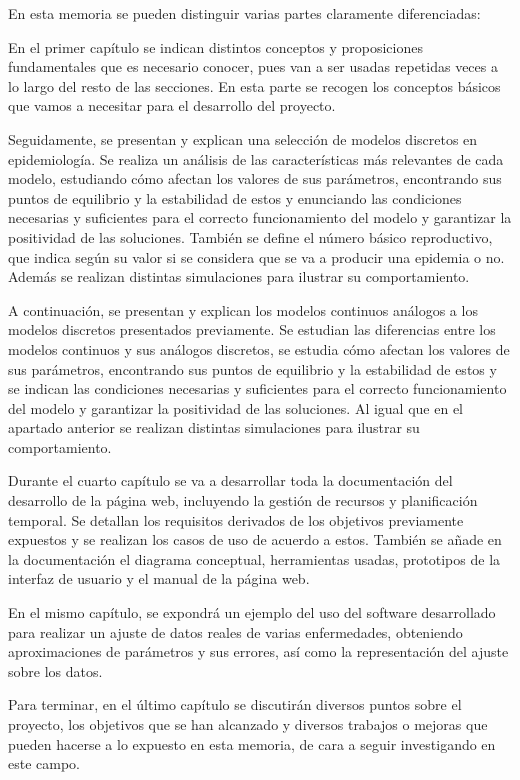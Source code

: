 En esta memoria se pueden distinguir varias partes claramente diferenciadas:

En el primer capítulo se indican distintos conceptos y proposiciones fundamentales que es necesario conocer, pues van a ser usadas repetidas veces a lo largo del resto de las secciones. En esta parte se recogen los conceptos básicos que vamos a necesitar para el desarrollo del proyecto.

Seguidamente, se presentan y explican una selección de modelos discretos en epidemiología. Se realiza un análisis de las características más relevantes de cada modelo, estudiando cómo afectan los valores de sus parámetros, encontrando sus puntos de equilibrio y la estabilidad de estos y enunciando las condiciones necesarias y suficientes para el correcto funcionamiento del modelo y garantizar la positividad de las soluciones. También se define el número básico reproductivo, que indica según su valor si se considera que se va a producir una epidemia o no. Además se realizan distintas simulaciones para ilustrar su comportamiento. 

A continuación, se presentan y explican los modelos continuos análogos a los modelos discretos presentados previamente. Se estudian las diferencias entre los modelos continuos y sus análogos discretos, se estudia cómo afectan los valores de sus parámetros, encontrando sus puntos de equilibrio y la estabilidad de estos y se indican las condiciones necesarias y suficientes para el correcto funcionamiento del modelo y garantizar la positividad de las soluciones. Al igual que en el apartado anterior se realizan distintas simulaciones para ilustrar su comportamiento.

Durante el cuarto capítulo se va a desarrollar toda la documentación del desarrollo de la página web, incluyendo la gestión de recursos y planificación temporal. Se detallan los requisitos derivados de los objetivos previamente expuestos y se realizan los casos de uso de acuerdo a estos. También se añade en la documentación el diagrama conceptual, herramientas usadas, prototipos de la interfaz de usuario y el manual de la página web.

En el mismo capítulo, se expondrá un ejemplo del uso del software desarrollado para realizar un ajuste de datos reales de varias enfermedades, obteniendo aproximaciones de parámetros y sus errores, así como la representación del ajuste sobre los datos.

Para terminar, en el último capítulo se discutirán diversos puntos sobre el proyecto, los objetivos que se han alcanzado y diversos trabajos o mejoras que pueden hacerse a lo expuesto en esta memoria, de cara a seguir investigando en este campo.


